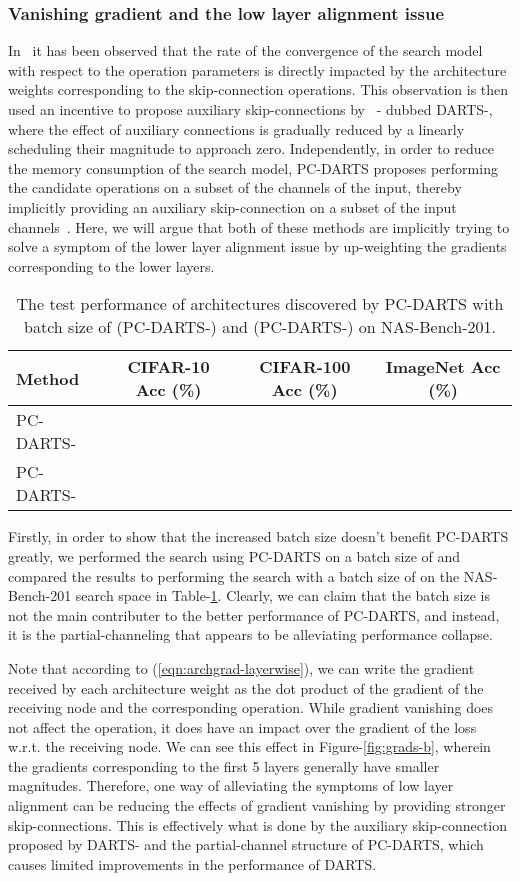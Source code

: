 \documentclass{article} \usepackage{fancyhdr, iclr2023_conference, times}
\newcommand{\lambdafn}{layer alignment\xspace}
\begin{document}
\subsubsection{Vanishing gradient and the low \lambdafn issue}
\par In~\citep{DBLP:conf/nips/ZhouXSH20} it has been observed that the rate of the convergence of the search model with respect to the operation parameters is directly impacted by the architecture weights corresponding to the skip-connection operations. This observation is then used an incentive to propose auxiliary skip-connections by~\citep{DBLP:conf/iclr/ChuW0LWY21} - dubbed DARTS-, where the effect of auxiliary connections is gradually reduced by a linearly scheduling their magnitude to approach zero. Independently, in order to reduce the memory consumption of the search model, PC-DARTS proposes performing the candidate operations on a subset of the channels of the input, thereby implicitly providing an auxiliary skip-connection on a subset of the input channels~\citep{DBLP:conf/iclr/XuX0CQ0X20}. Here, we will argue that both of these methods are implicitly trying to solve a symptom of the lower \lambdafn issue by up-weighting the gradients corresponding to the lower layers.
\par 
\begin{table}[t]
\centering
\caption{The test performance of architectures discovered by PC-DARTS with batch size of  (PC-DARTS-) and  (PC-DARTS-) on NAS-Bench-201.} 
\label{table:pc-darts-bs}
\begin{tabular}{l|c|c|c}
\textbf{Method} & \textbf{CIFAR-10 Acc (\%)} & \textbf{CIFAR-100 Acc (\%)} & \textbf{ImageNet Acc (\%)}\\ \hline
    PC-DARTS- &  &  &  \\
    PC-DARTS- &  &  & 
\end{tabular}
\end{table}
Firstly, in order to show that the increased batch size doesn't benefit PC-DARTS greatly, we performed the search using PC-DARTS on a batch size of  and compared the results to performing the search with a batch size of  on the NAS-Bench-201 search space in Table-\ref{table:pc-darts-bs}. Clearly, we can claim that the batch size is not the main contributer to the better performance of PC-DARTS, and instead, it is the partial-channeling that appears to be alleviating performance collapse.
\par Note that according to (\ref{eqn:archgrad-layerwise}), we can write the gradient received by each architecture weight as the dot product of the gradient of the receiving node and the corresponding operation. While gradient vanishing does not affect the operation, it does have an impact over the gradient of the loss w.r.t. the receiving node. We can see this effect in Figure-\ref{fig:grads-b}, wherein the gradients corresponding to the first 5 layers generally have smaller magnitudes. Therefore, one way of alleviating the symptoms of low \lambdafn can be reducing the effects of gradient vanishing by providing stronger skip-connections. This is effectively what is done by the auxiliary skip-connection proposed by DARTS- and the partial-channel structure of PC-DARTS, which causes limited improvements in the performance of DARTS.
\end{document}
